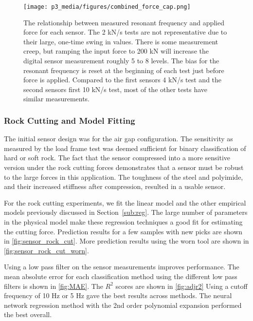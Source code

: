 \FloatBarrier

\begin{figure}[t]
\centering
\texttt{[image: p3\_media/figures/combined\_force\_cap.png]}
\caption{The relationship between measured resonant frequency and applied force for each sensor.
The 2 kN/s tests are not representative due to their large, one-time swing in values.
There is some measurement creep, but ramping the input force to 200 kN
will increase the digital sensor measurement roughly 5 to 8 levels. 
The bias for the resonant frequency is reset at the beginning of each test just before
force is applied. 
Compared to the first sensors 4 kN/s test and the second sensors first 10 kN/s test,
most of the other tests have similar measurements.
}
\label{fig:sensor_load_frame_sensitivity}
\end{figure}


\subsubsection{Rock Cutting and Model Fitting}

The initial sensor design was for the air gap configuration. The sensitivity as measured by the 
load frame test was deemed sufficient for binary classification of hard or soft rock.
The fact that the sensor compressed into a more sensitive version under the rock cutting forces
demonstrates that a sensor must be robust to the large forces in this application.
The toughness of the steel and polyimide, and their increased stiffness after compression,
resulted in a usable sensor.

For the rock cutting experiments, we fit the linear model and the other
 empirical models previously discussed in Section~\ref{sub:reg}.
The large number of parameters in the physical model make these regression
techniques a good fit for estimating the cutting force.
Prediction results for a few samples with new picks are shown in \ref{fig:sensor_rock_cut}.
More prediction results using the worn tool are shown in \ref{fig:sensor_rock_cut_worn}.

Using a low pass filter on the sensor measurements improves performance. 
The mean absolute error for each classification method using the different low pass filters is shown in 
\ref{fig:MAE}. The $R^2$ scores are shown in \ref{fig:adjr2}
Using a cutoff frequency of 10 Hz or 5 Hz gave the best results across methods.
The neural network regression method with the 2nd order polynomial expansion performed the best overall.

